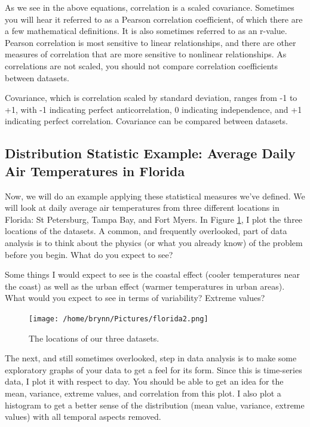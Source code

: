 \documentclass{article}
\begin{document}
As we see in the above equations, correlation is a scaled covariance. Sometimes you will hear it referred to as a Pearson correlation coefficient, of which there are a few mathematical definitions. It is also sometimes referred to as an r-value. Pearson correlation is most sensitive to linear relationships, and there are other measures of correlation that are more sensitive to nonlinear relationships. As correlations are not scaled, you should not compare correlation coefficients between datasets.

Covariance, which is correlation scaled by standard deviation, ranges from -1 to +1, with -1 indicating perfect anticorrelation, 0 indicating independence, and +1 indicating perfect correlation. Covariance can be compared between datasets. 


\subsection{Distribution Statistic Example: Average Daily Air Temperatures in Florida}
Now, we will do an example applying these statistical measures we've defined. We will look at daily average air temperatures from three different locations in Florida: St Petersburg, Tampa Bay, and Fort Myers. In Figure \ref{fig:florida}, I plot the three locations of the datasets. A common, and frequently overlooked, part of data analysis is to think about the physics (or what you already know) of the problem before you begin. What do you expect to see?

Some things I would expect to see is the coastal effect (cooler temperatures near the coast) as well as the urban effect (warmer temperatures in urban areas). What would you expect to see in terms of variability? Extreme values? 

\begin{figure}[htbp]
\centerline{\texttt{[image: /home/brynn/Pictures/florida2.png]}}
\caption[]{\label{fig:florida}The locations of our three datasets.}
\end{figure}


The next, and still sometimes overlooked, step in data analysis is to make some exploratory graphs of your data to get a feel for its form. Since this is time-series data, I plot it with respect to day. You should be able to get an idea for the mean, variance, extreme values, and correlation from this plot. I also plot a histogram to get a better sense of the  distribution (mean value, variance, extreme values) with all temporal aspects removed.
\end{document}
